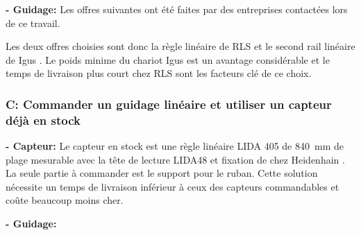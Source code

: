 \textbf{ - Guidage:}
\newline
Les offres suivantes ont été faites par des entreprises contactées lors de ce travail.

\begin{table}[H]
  \centering
  \caption{Offres pour le guidage}
  \label{tab:OffreGuid1}
\end{table}

Les deux offres choisies sont donc la règle linéaire de RLS \cite{RLS} et le second rail linéaire de Igus \cite{Igus}. Le poids minime du chariot Igus \cite{Igus} est un avantage considérable
et le temps de livraison plus court chez RLS \cite{RLS} sont les facteurs clé de ce choix.

\subsubsection{C: Commander un guidage linéaire et utiliser un capteur déjà en stock}
\textbf{ - Capteur:}
\newline
Le capteur en stock est une règle linéaire LIDA 405 de 840~mm de plage mesurable avec la tête de lecture LIDA48 et fixation de chez Heidenhain \cite{Heidenhain}. La seule partie à commander
est le support pour le ruban. Cette solution nécessite un temps de livraison inférieur à ceux des capteurs commandables et coûte beaucoup moins cher.

\textbf{ - Guidage:}
\newline

